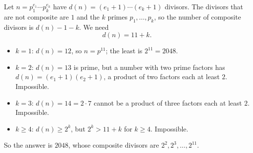 Let $n=p_1^{e_1}\cdots p_k^{e_k}$ have $d(n)=(e_1+1)\cdots(e_k+1)$ divisors. The divisors that are not composite are $1$ and the $k$ primes $p_1,\dots,p_k$, so the number of composite divisors is $d(n)-1-k$. We need
\[
d(n)=11+k .
\]
\begin{itemize}
\item $k=1$: $d(n)=12$, so $n=p^{11}$; the least is $2^{11}=2048$.
\item $k=2$: $d(n)=13$ is prime, but a number with two prime factors has $d(n)=(e_1+1)(e_2+1)$, a product of two factors each at least $2$. Impossible.
\item $k=3$: $d(n)=14=2\cdot7$ cannot be a product of three factors each at least $2$. Impossible.
\item $k\ge4$: $d(n)\ge2^k$, but $2^k>11+k$ for $k\ge4$. Impossible.
\end{itemize}
So the answer is $\boxed{2048}$, whose composite divisors are $2^2,2^3,\dots,2^{11}$.
